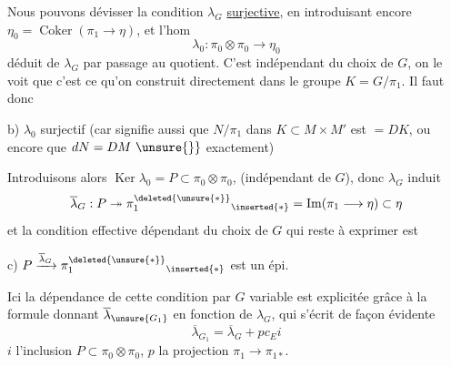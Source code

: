 Nous pouvons dévisser la condition
$\lambda_G$ \uline{surjective}, en introduisant encore
$\eta_0=\operatorname{Coker}(\pi_1\longrightarrow\eta)$, et l'hom
\[
\lambda_0:\pi_0\otimes\pi_0\longrightarrow\eta_0
\]
déduit de $\lambda_G$ par passage au quotient. C'est
indépendant du choix de $G$, on le voit que
c'est ce qu'on construit directement dans
le groupe $K=G/\pi_1$. Il faut donc

b) $\lambda_0$ surjectif (car signifie aussi
que $N/\pi_1$ dans $K\subset M\times M'$ est $=DK$,
ou encore que $dN=DM\ \unsure{\}}$ exactement)

 Introduisons alors $\operatorname{Ker}\lambda_0=P\subset\pi_0\otimes\pi_0$,
(indépendant de $G$), donc $\lambda_G$ induit
\[
\overline\lambda_G:P\twoheadrightarrow\pi_1^{\deleted{\unsure{*}}}{}_{\inserted{*}}=\operatorname{Im}(\pi_1\longrightarrow\eta)\subset\eta
\]
et la condition effective dépendant du
choix de $G$ qui reste à exprimer
est

c) $P\xrightarrow{\overline\lambda_G}\pi_1^{\deleted{\unsure{*}}}{}_{\inserted{*}}$ est un épi.

Ici la dépendance de cette condition
par $G$ variable est explicitée grâce à
la formule donnant $\overline\lambda_{\unsure{G_1}}$ en fonction
de $\lambda_G$, qui s'écrit de façon évidente
\[
\overline\lambda_{G_1}=\overline\lambda_G+pc_Ei
\]
$i$ l'inclusion $P\subset\pi_0\otimes\pi_0$, $p$ la projection $\pi_1\longrightarrow\pi_{1*}$.
